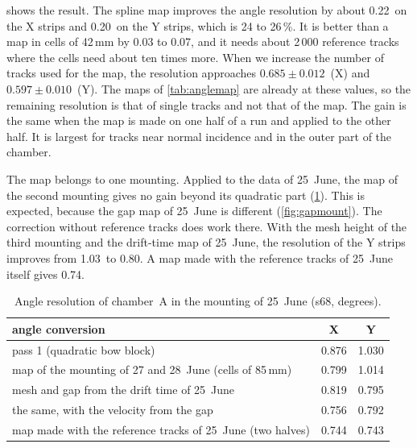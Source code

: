  shows the result. The spline map improves the angle resolution by about 0.22\textdegree\ on the
X strips and 0.20\textdegree\ on the Y strips, which is 24 to 26\,\%. It is better than a map in cells of 42\,mm by
0.03 to 0.07\textdegree, and it needs about 2\,000 reference tracks where the cells need about ten times more. When we
increase the number of tracks used for the map, the resolution approaches $0.685\pm0.012$\textdegree\ (X) and
$0.597\pm0.010$\textdegree\ (Y). The maps of \cref{tab:anglemap} are already at these values, so the remaining
resolution is that of single tracks and not that of the map. The gain is the same when the map is made on one half of
a run and applied to the other half. It is largest for tracks near normal incidence and in the outer part of the
chamber.

The map belongs to one mounting. Applied to the data of 25~June, the map of the second mounting gives no gain beyond
its quadratic part (\cref{tab:anglemount}). This is expected, because the gap map of 25~June is different
(\cref{fig:gapmount}). The correction without reference tracks does work there. With the mesh height of the third
mounting and the drift-time map of 25~June, the resolution of the Y strips improves from 1.03\textdegree\ to
0.80\textdegree. A map made with the reference tracks of 25~June itself gives 0.74\textdegree.

\begin{table}[tbp]
  \centering
  \caption{Angle resolution of chamber~A in the mounting of 25~June (s68, degrees).}
  \label{tab:anglemount}
  \begin{tabular}{lcc}
    \hline
    angle conversion & X & Y \\
    \hline
    pass 1 (quadratic bow block)                              & 0.876 & 1.030 \\
    map of the mounting of 27 and 28~June (cells of 85\,mm)   & 0.799 & 1.014 \\
    mesh and gap from the drift time of 25~June               & 0.819 & 0.795 \\
    the same, with the velocity from the gap                  & 0.756 & 0.792 \\
    map made with the reference tracks of 25~June (two halves) & 0.744 & 0.743 \\
    \hline
  \end{tabular}
\end{table}

